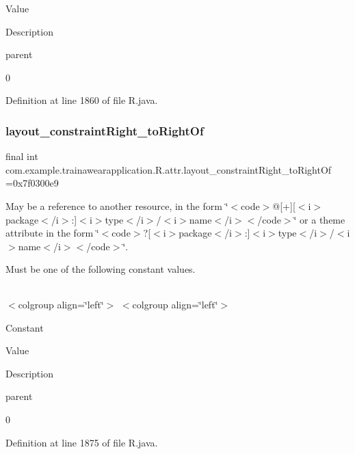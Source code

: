 Value

Description 

parent

0

Definition at line 1860 of file R.\+java.

\mbox{\label{classcom_1_1example_1_1trainawearapplication_1_1_r_1_1attr_a22e180345beda1b0345b8ca0dd47d02e}} 
\subsubsection{\texorpdfstring{layout\_constraintRight\_toRightOf}{layout\_constraintRight\_toRightOf}}
{\footnotesize\ttfamily final int com.\+example.\+trainawearapplication.\+R.\+attr.\+layout\+\_\+constraint\+Right\+\_\+to\+Right\+Of =0x7f0300e9\hspace{0.3cm}{\ttfamily [static]}}

May be a reference to another resource, in the form \char`\"{}$<$code$>$@\mbox{[}+\mbox{]}\mbox{[}$<$i$>$package$<$/i$>$\+:\mbox{]}$<$i$>$type$<$/i$>$/$<$i$>$name$<$/i$>$$<$/code$>$\char`\"{} or a theme attribute in the form \char`\"{}$<$code$>$?\mbox{[}$<$i$>$package$<$/i$>$\+:\mbox{]}$<$i$>$type$<$/i$>$/$<$i$>$name$<$/i$>$$<$/code$>$\char`\"{}. 

Must be one of the following constant values.

\tabulinesep=1mm
\begin{longtabu}spread 0pt [c]{*{0}{|X[-1]}|}
\hline
\end{longtabu}
$<$colgroup align=\char`\"{}left\char`\"{}$>$ $<$colgroup align=\char`\"{}left\char`\"{}$>$ 

Constant

Value

Description 

parent

0

Definition at line 1875 of file R.\+java.

\mbox{\label{classcom_1_1example_1_1trainawearapplication_1_1_r_1_1attr_aa9d7703f07cfa469a46816b6a865ee30}} 
